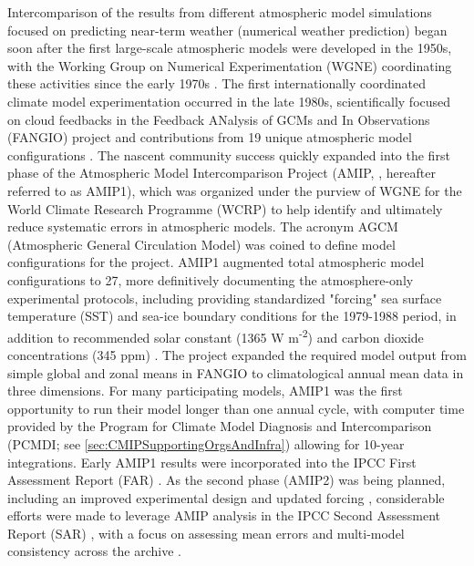\documentclass[gmd, preprint]{copernicus}
\begin{document}
Intercomparison of the results from different atmospheric model simulations focused on predicting near-term weather (numerical weather prediction) began soon after the first large-scale atmospheric models were developed in the 1950s, with the Working Group on Numerical Experimentation (WGNE) coordinating these activities since the early 1970s \citep{gates_ams_1992}. The first internationally coordinated climate model experimentation occurred in the late 1980s, scientifically focused on cloud feedbacks in the Feedback ANalysis of GCMs and In Observations (FANGIO) project and contributions from 19 unique atmospheric model configurations \citep{cess_methodology_1988, cess_interpretation_1989, cess_intercomparison_1990, cess_first_1991}. The nascent community success quickly expanded into the first phase of the Atmospheric Model Intercomparison Project (AMIP, \citet{gates_amip_1992}, hereafter referred to as AMIP1), which was organized under the purview of WGNE for the World Climate Research Programme (WCRP) to help identify and ultimately reduce systematic errors in atmospheric models. The acronym AGCM (Atmospheric General Circulation Model) was coined to define model configurations for the project. AMIP1 augmented total atmospheric model configurations to 27, more definitively documenting the atmosphere-only experimental protocols, including providing standardized "forcing" sea surface temperature (SST) and sea-ice boundary conditions for the 1979-1988 period, in addition to recommended solar constant (1365 W m\textsuperscript{-2}) and carbon dioxide concentrations (345 ppm) \citep{gates_amip_1991}. The project expanded the required model output from simple global and zonal means in FANGIO to climatological annual mean data in three dimensions. For many participating models, AMIP1 was the first opportunity to run their model longer than one annual cycle, with computer time provided by the Program for Climate Model Diagnosis and Intercomparison (PCMDI; see \autoref{sec:CMIPSupportingOrgsAndInfra}) allowing for 10-year integrations. Early AMIP1 results were incorporated into the IPCC First Assessment Report (FAR) \citep{gates_validation_1990}. As the second phase (AMIP2) was being planned, including an improved experimental design and updated forcing \citep{liang_pcmdi_1997, taylor_pcmdi_2000}, considerable efforts were made to leverage AMIP analysis in the IPCC Second Assessment Report (SAR) \citep{gates_climate_1996}, with a focus on assessing mean errors and multi-model consistency across the archive \citep{gates_amip_1995}.
\end{document}
